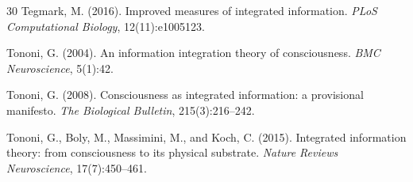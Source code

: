 \documentclass[12pt,a4paper]{article}
\begin{document}
\begin{thebibliography}{30}
Tegmark, M. (2016).
\newblock Improved measures of integrated information.
\newblock \emph{PLoS Computational Biology}, 12(11):e1005123.

Tononi, G. (2004).
\newblock An information integration theory of consciousness.
\newblock \emph{BMC Neuroscience}, 5(1):42.

Tononi, G. (2008).
\newblock Consciousness as integrated information: a provisional manifesto.
\newblock \emph{The Biological Bulletin}, 215(3):216--242.

Tononi, G., Boly, M., Massimini, M., and Koch, C. (2015).
\newblock Integrated information theory: from consciousness to its physical substrate.
\newblock \emph{Nature Reviews Neuroscience}, 17(7):450--461.

\end{thebibliography}
\end{document}
